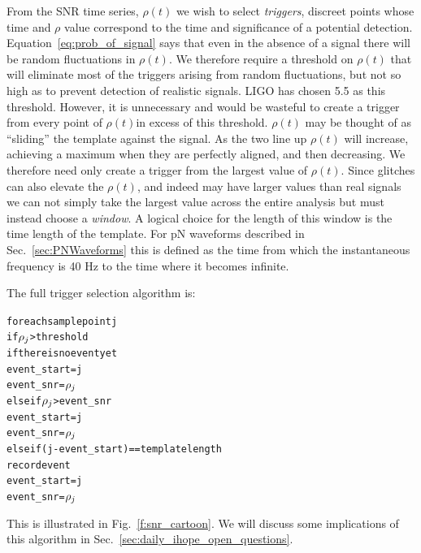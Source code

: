 From the SNR time series, $\rho(t)$ we wish to select \emph{triggers},
discreet points whose time and $\rho$ value correspond to the time and
significance of a potential detection.
Equation~\ref{eq:prob_of_signal} says that even in the absence of a
signal there will be random fluctuations in $\rho(t)$.  We therefore
require a threshold on $\rho(t)$ that will eliminate most of the
triggers arising from random fluctuations, but not so high as to
prevent detection of realistic signals.  LIGO has chosen 5.5 as this
threshold.  However, it is unnecessary and would be wasteful to create
a trigger from every point of $\rho(t)$in excess of this threshold.
$\rho(t)$ may be thought of as ``sliding'' the template against the
signal.  As the two line up $\rho(t)$ will increase, achieving a
maximum when they are perfectly aligned, and then decreasing.  We
therefore need only create a trigger from the largest value of
$\rho(t)$.  Since glitches can also elevate the $\rho(t)$, and indeed
may have larger values than real signals we can not simply take the
largest value across the entire analysis but must instead choose a
\emph{window}.  A logical choice for the length of this window is the
time length of the template.  For pN waveforms described in
Sec.~\ref{sec:PNWaveforms} this is defined as the time from which
the instantaneous frequency is 40 Hz to the time where it becomes
infinite.

The full trigger selection algorithm is:
\newpage

\begin{alltt}
for each sample point j
  if \(\rho\sb{j}\) > threshold
    if there is no event yet
      event\_start = j
      event\_snr   = \(\rho\sb{j}\)
    else if \(\rho\sb{j}\) > event\_snr
      event\_start = j
      event\_snr = \(\rho\sb{j}\)
    else if (j - event\_start) == template length
      record event
      event\_start = j
      event\_snr   = \(\rho\sb{j}\)
\end{alltt}
%
This is illustrated in Fig.~\ref{f:snr_cartoon}.  We will discuss
some implications of this algorithm in
Sec.~\ref{sec:daily_ihope_open_questions}.


